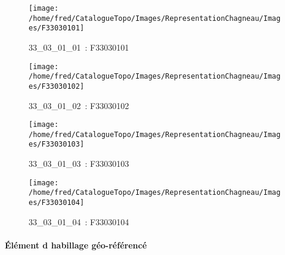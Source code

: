 \documentclass[12pt,titlepage,oneside]{book}
\begin{document}
\begin{figure}[h!]
  \hfill         %
  \begin{minipage}[t]{3cm}
    \begin{center}
      \texttt{[image: /home/fred/CatalogueTopo/Images/RepresentationChagneau/Images/F33030101]}
      \caption[~33\_03\_01\_01]{\small{33\_03\_01\_01~:} \tiny{F33030101}}\label{F33030101}
    \end{center}
  \end{minipage}
  \begin{minipage}[t]{3cm}
    \begin{center}
      \texttt{[image: /home/fred/CatalogueTopo/Images/RepresentationChagneau/Images/F33030102]}
      \caption[~33\_03\_01\_02]{\small{33\_03\_01\_02~:} \tiny{F33030102}}\label{F33030102}
    \end{center}
  \end{minipage}
  \begin{minipage}[t]{3cm}
    \begin{center}
      \texttt{[image: /home/fred/CatalogueTopo/Images/RepresentationChagneau/Images/F33030103]}
      \caption[~33\_03\_01\_03]{\small{33\_03\_01\_03~:} \tiny{F33030103}}\label{F33030103}
    \end{center}
  \end{minipage}
  \begin{minipage}[t]{3cm}
    \begin{center}
      \texttt{[image: /home/fred/CatalogueTopo/Images/RepresentationChagneau/Images/F33030104]}
      \caption[~33\_03\_01\_04]{\small{33\_03\_01\_04~:} \tiny{F33030104}}\label{F33030104}
    \end{center}
  \end{minipage}
\end{figure}


\paragraph{Élément d habillage géo-référencé}
\noindent
\vspace{\baselineskip}
\end{document}
